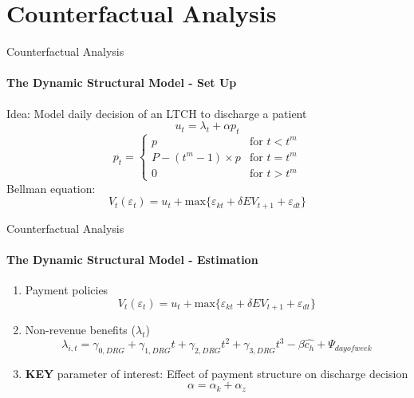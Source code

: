 \documentclass{beamer}
\begin{document}
\section{Counterfactual Analysis}
\begin{frame}{Counterfactual Analysis}
\framesubtitle{The Dynamic Structural Model - Set Up}
Idea: Model daily decision of an LTCH to discharge a patient\\

\begin{equation}
u_t = \lambda_t + \alpha p_t
\end{equation}
\begin{equation*}
p_t = \begin{cases}
p&\text{for $t < t^m$}\\
P - (t^m - 1) \times p &\text{for $t = t^m$} \\
0 &\text{for $t > t^m$}
\end{cases}
\end{equation*}
Bellman equation:
\begin{equation}
V_t(\varepsilon_t) = u_t + \text{max\{$\varepsilon_{kt} + \delta EV_{t+1} + \varepsilon_{dt} $\}}
\end{equation}
\end{frame}

\begin{frame}{Counterfactual Analysis}
\framesubtitle{The Dynamic Structural Model - Estimation }
\begin{enumerate}
	\item Payment policies
			\begin{equation}
			V_t(\varepsilon_t) = u_t + \text{max\{$\varepsilon_{kt} + \delta EV_{t+1} + 				\varepsilon_{dt} $\}}
			\end{equation}
	\item Non-revenue benefits ($\lambda_t$)
			\begin{equation}
		\lambda_{i,t} = \gamma_{0, DRG} + \gamma_{1, DRG}t+ \gamma_{2, DRG}t^2+ \gamma_{3, DRG}t^3 - \beta \hat{c_h} + \Psi_{day of week}
			\end{equation}
	\item \textbf{KEY} parameter of interest: Effect of payment structure on discharge decision
			\begin{equation}
			\alpha = \alpha_k + \alpha_z
			\end{equation}
\end{enumerate}
\end{frame}
\end{document}
